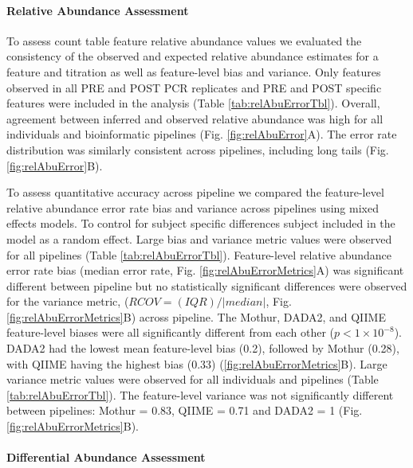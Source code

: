 \documentclass{bmcart}
\begin{document}

\paragraph{Relative Abundance Assessment}
To assess count table feature relative abundance values we evaluated the consistency of
the observed and expected relative abundance estimates for a feature and
titration as well as feature-level bias and variance.
Only features observed in all PRE and POST PCR replicates
and PRE and POST specific features were included in the analysis (Table
\ref{tab:relAbuErrorTbl}). Overall, agreement between inferred
and observed relative abundance was high for all individuals and
bioinformatic pipelines (Fig. \ref{fig:relAbuError}A). The error rate
distribution was similarly consistent across pipelines, including long
tails (Fig. \ref{fig:relAbuError}B).

To assess quantitative accuracy across pipeline we compared the feature-level relative
abundance error rate bias and variance across pipelines
using mixed effects models. To control for subject specific differences
subject included in the model as a random effect.
Large bias and variance metric values were
observed for all pipelines (Table \ref{tab:relAbuErrorTbl}).
Feature-level relative abundance error rate bias (median error rate, Fig.
\ref{fig:relAbuErrorMetrics}A) was significant different between
pipeline but no statistically significant differences were observed
for the variance metric, (\(RCOV=(IQR)/|median|\), Fig.
\ref{fig:relAbuErrorMetrics}B) across pipeline. The Mothur, DADA2,
and QIIME feature-level biases were all significantly different from
each other (\(p < 1\times 10^{-8}\)). DADA2 had the lowest mean
feature-level bias (0.2), followed by Mothur (0.28), with QIIME having the highest bias
(0.33) (\ref{fig:relAbuErrorMetrics}B). Large variance metric values
were observed for all individuals and pipelines (Table
\ref{tab:relAbuErrorTbl}). The feature-level variance was not
significantly different between pipelines: Mothur = 0.83, QIIME = 0.71
and DADA2 = 1 (Fig. \ref{fig:relAbuErrorMetrics}B).

\paragraph{Differential Abundance Assessment}

\end{document}
